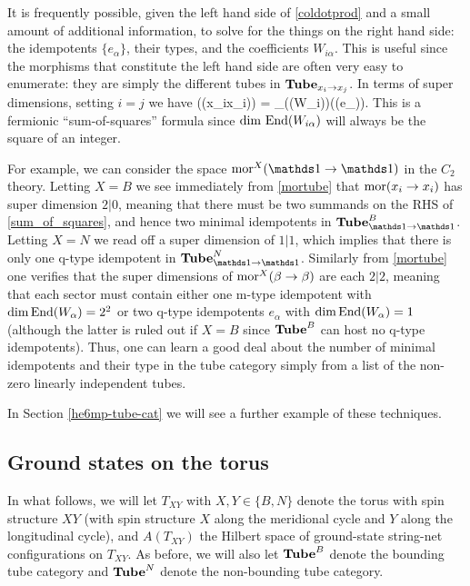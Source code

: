 It is frequently possible, given the left hand side of \eqref{coldotprod} and a small amount of additional information, 
to solve for the things on the right hand side: the idempotents $\{e_\alpha\}$, their types, and the coefficients $W_{i\alpha}$.
This is useful since the morphisms that constitute the left hand side are often very easy to enumerate: they are simply the different tubes in $\textbf{Tube}_{x_i\rightarrow x_j}$. 
In terms of super dimensions, setting $i=j$ we have 
\be \label{sum_of_squares} \dim(\mor(x_i\ra x_i)) = \sum_\alpha \dim(\End(W_{i\alpha}))\dim(\End(e_\alpha)).\ee
This is a fermionic ``sum-of-squares'' formula since $\dim\,\text{End}(W_{i\alpha})$ will always be the square of 
an integer. 

For example, we can consider the space $\mor^X(\unit\ra\unit)$ in the $C_2$ theory.
Letting $X=B$ we see immediately from \eqref{mortube} that $\text{mor}(x_i\rightarrow x_i)$ has super dimension $2|0$, meaning that there must be two summands on the RHS of \eqref{sum_of_squares}, and hence 
two minimal idempotents in $\tube^B_{\unit\ra\unit}$. Letting $X=N$ we read off a super dimension of $1|1$, which implies that there is only one q-type idempotent in $\tube^N_{\unit\ra\unit}$. 
Similarly from \eqref{mortube} one verifies that the super dimensions of $\text{mor}^X(\beta\rightarrow\beta)$ 
are each $2|2$, meaning that each sector must contain either one m-type idempotent with $\dim\text{End}(W_{\alpha})=2^2$ or two q-type idempotents $e_\alpha$ with 
$\dim\text{End}(W_{\alpha})=1$ (although the latter is ruled out if $X=B$ since $\textbf{Tube}^B$ can 
host no q-type idempotents).
Thus, one can learn a good deal about the number of minimal idempotents and their type in the tube category 
simply from a list of the non-zero linearly independent tubes. 

In Section \ref{he6mp-tube-cat} we will see a further example of these techniques.

\subsection{Ground states on the torus} \label{ground_states_on_torus}

In what follows, we will let $T_{XY}$ with $X,Y\in\{B,N\}$ denote the torus with spin structure $XY$
(with spin structure $X$ along the meridional cycle and $Y$ along the longitudinal cycle),
and $A(T_{XY})$ 
the Hilbert space of ground-state string-net configurations on $T_{XY}$.  
As before, we will also let $\textbf{Tube}^B$ denote the bounding tube category and $\textbf{Tube}^N$ denote the non-bounding tube category. 

